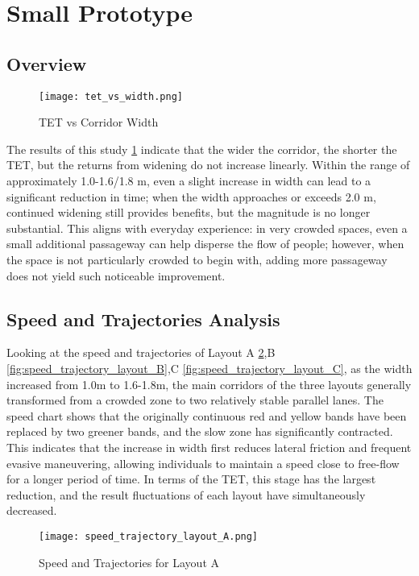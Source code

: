 \section{Small Prototype}
\subsection{Overview}
\begin{figure}[h]
    \centering
    \texttt{[image: tet\_vs\_width.png]}
    \caption{TET vs Corridor Width}
    \label{fig:tet_vs_width}
\end{figure}
The results of this study \ref{fig:tet_vs_width} indicate that the wider the corridor, the shorter the TET, but the returns from widening do not increase linearly. Within the range of approximately 1.0-1.6/1.8 m, even a slight increase in width can lead to a significant reduction in time; when the width approaches or exceeds 2.0 m, continued widening still provides benefits, but the magnitude is no longer substantial. This aligns with everyday experience: in very crowded spaces, even a small additional passageway can help disperse the flow of people; however, when the space is not particularly crowded to begin with, adding more passageway does not yield such noticeable improvement.

\subsection{Speed and Trajectories Analysis}
Looking at the speed and trajectories of Layout A \ref{fig:speed_trajectory_layout_A},B \ref{fig:speed_trajectory_layout_B},C \ref{fig:speed_trajectory_layout_C}, as the width increased from 1.0m to 1.6-1.8m, the main corridors of the three layouts generally transformed from a crowded zone to two relatively stable parallel lanes. The speed chart shows that the originally continuous red and yellow bands have been replaced by two greener bands, and the slow zone has significantly contracted. This indicates that the increase in width first reduces lateral friction and frequent evasive maneuvering, allowing individuals to maintain a speed close to free-flow for a longer period of time. In terms of the TET, this stage has the largest reduction, and the result fluctuations of each layout have simultaneously decreased.

\begin{figure}[h]
    \centering
    \texttt{[image: speed\_trajectory\_layout\_A.png]}
    \caption{Speed and Trajectories for Layout A}
    \label{fig:speed_trajectory_layout_A}
\end{figure}

